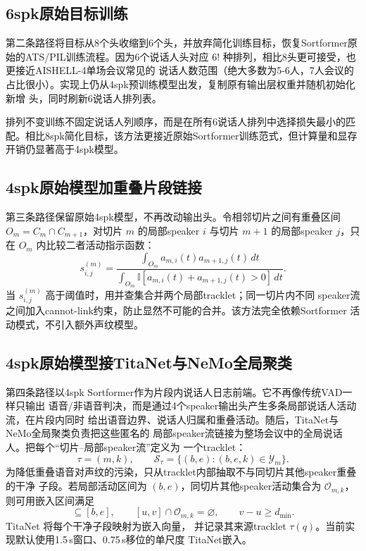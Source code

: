 \documentclass[UTF8,a4paper,10pt]{ctexart}
\begin{document}
\subsection{6spk原始目标训练}

第二条路径将目标从8个头收缩到6个头，并放弃简化训练目标，恢复Sortformer原始的ATS/PIL训练流程。因为6个说话人头对应 $6!$ 种排列，相比8头更可接受，也更接近AISHELL-4单场会议常见的
说话人数范围（绝大多数为5-6人，7人会议的占比很小）。实现上仍从4spk预训练模型出发，复制原有输出层权重并随机初始化新增
头，同时刷新6说话人排列表。

排列不变训练不固定说话人列顺序，而是在所有6说话人排列中选择损失最小的匹配。相比8spk简化目标，该方法更接近原始Sortformer训练范式，但计算量和显存开销仍显著高于4spk模型。

\subsection{4spk原始模型加重叠片段链接}

第三条路径保留原始4spk模型，不再改动输出头。令相邻切片之间有重叠区间
$O_m=C_m\cap C_{m+1}$，对切片 $m$ 的局部speaker $i$ 与切片 $m+1$ 的局部speaker
$j$，只在 $O_m$ 内比较二者活动指示函数：
\begin{equation}
s_{i,j}^{(m)}=
\frac{\int_{O_m} a_{m,i}(t)a_{m+1,j}(t)\,dt}
{\int_{O_m} \mathbb{I}[a_{m,i}(t)+a_{m+1,j}(t)>0]\,dt}.
\end{equation}
当 $s_{i,j}^{(m)}$ 高于阈值时，用并查集合并两个局部tracklet；同一切片内不同
speaker流之间加入cannot-link约束，防止显然不可能的合并。该方法完全依赖Sortformer
活动模式，不引入额外声纹模型。

\subsection{4spk原始模型接TitaNet与NeMo全局聚类}

第四条路径以4spk Sortformer作为片段内说话人日志前端。它不再像传统VAD一样只输出
语音/非语音判决，而是通过4个speaker输出头产生多条局部说话人活动流，在片段内同时
给出语音边界、说话人归属和重叠活动。随后，TitaNet与NeMo全局聚类负责把这些匿名的
局部speaker流链接为整场会议中的全局说话人。把每个“切片--局部speaker流”定义为
一个tracklet：
\begin{equation}
\tau=(m,k),\qquad
\mathcal{S}_{\tau}=\{(b,e):(b,e,k)\in\mathcal{Y}_m\}.
\end{equation}
为降低重叠语音对声纹的污染，只从tracklet内部抽取不与同切片其他speaker重叠的干净
子段。若局部活动区间为 $(b,e)$，同切片其他speaker活动集合为
$\mathcal{O}_{m,k}$，则可用嵌入区间满足
\begin{equation}
[u,v]\subseteq[b,e],\qquad
[u,v]\cap \mathcal{O}_{m,k}=\varnothing,\qquad v-u\ge d_{\min}.
\end{equation}
TitaNet 将每个干净子段映射为嵌入向量，
并记录其来源tracklet $\tau(q)$。当前实现默认使用1.5\,s窗口、0.75\,s移位的单尺度
TitaNet嵌入。
\end{document}
